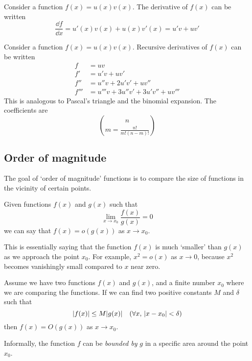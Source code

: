 \begin{definition}
	Consider a function \(f(x) = u(x)v(x)\).
	The derivative of \(f(x)\) can be written
	\begin{equation}
		\frac{\dd{f}}{\dd{x}} = u'(x)v(x) + u(x)v'(x) = u'v + uv'
	\end{equation}
\end{definition}

\begin{definition}
	Consider a function \(f(x) = u(x)v(x)\).
	Recursive derivatives of \(f(x)\) can be written
	\begin{align}
		f    & = uv                                        \\
		f'   & = u'v + uv' \nonumber                       \\
		f''  & = u''v + 2u'v' + uv'' \nonumber             \\
		f''' & = u'''v + 3u''v' + 3u'v'' + uv''' \nonumber
	\end{align}
	This is analogous to Pascal's triangle and the binomial expansion.
	The coefficients are
	\[n \choose m = \frac{n!}{m!(n-m)!}\]
\end{definition}

\subsection{Order of magnitude}
The goal of `order of magnitude' functions is to compare the size of functions in the vicinity of certain points.
\begin{definition}[Little \(o\)]
	Given functions \(f(x)\) and \(g(x)\) such that
	\begin{equation}
		\lim\limits_{x \to x_0} \frac{f(x)}{g(x)} = 0
	\end{equation}
	we can say that \(f(x) = o(g(x))\) as \(x \to x_0\).
\end{definition}

This is essentially saying that the function \(f(x)\) is much `smaller' than \(g(x)\) as we approach the point \(x_0\).
For example, \(x^2 = o(x)\) as \(x \to 0\), because \(x^2\) becomes vanishingly small compared to \(x\) near zero.

\begin{definition}
	Assume we have two functions \(f(x)\) and \(g(x)\), and a finite number \(x_0\) where we are comparing the functions.
	If we can find two positive constants \(M\) and \(\delta\) such that
	\begin{equation}
		\abs{f(x)} \leq M\abs{g(x)} \quad(\forall x,\, \abs{x-x_0} < \delta)
	\end{equation}
	then \(f(x) = O(g(x))\) as \(x \to x_0\).
\end{definition}
Informally, the function \(f\) can be \textit{bounded by} \(g\) in a specific area around the point \(x_0\).

